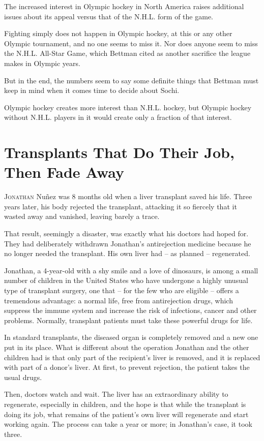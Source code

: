 ﻿\documentclass[12pt]{article}
\begin{document}
The increased interest in Olympic hockey in North America raises additional issues about its appeal
versus that of the N.H.L. form of the game.

Fighting simply does not happen in Olympic hockey, at this or any other Olympic tournament, and no
one seems to miss it. Nor does anyone seem to miss the N.H.L. All-Star Game, which Bettman cited as
another sacrifice the league makes in Olympic years.

But in the end, the numbers seem to say some definite things that Bettman must keep in mind when it
comes time to decide about Sochi.

Olympic hockey creates more interest than N.H.L. hockey, but Olympic hockey without N.H.L. players
in it would create only a fraction of that interest.

\section{Transplants That Do Their Job, Then Fade Away}

\lettrine{J}{onathan} Nu\~{n}ez was 8 months old when a liver transplant
saved his life. Three years later, his body rejected the transplant, attacking it so fiercely that
it wasted away and vanished, leaving barely a trace.

That result, seemingly a disaster, was exactly what his doctors had hoped for. They had deliberately
withdrawn Jonathan's antirejection medicine because he no longer needed the transplant. His own
liver had -- as planned -- regenerated.

Jonathan, a 4-year-old with a shy smile and a love of dinosaurs, is among a small number of children
in the United States who have undergone a highly unusual type of transplant surgery, one that -- for
the few who are eligible -- offers a tremendous advantage: a normal life, free from antirejection
drugs, which suppress the immune system and increase the risk of infections, cancer and other
problems. Normally, transplant patients must take these powerful drugs for life.

In standard transplants, the diseased organ is completely removed and a new one put in its place.
What is different about the operation Jonathan and the other children had is that only part of the
recipient's liver is removed, and it is replaced with part of a donor's liver. At first, to prevent
rejection, the patient takes the usual drugs.

Then, doctors watch and wait. The liver has an extraordinary ability to regenerate, especially in
children, and the hope is that while the transplant is doing its job, what remains of the patient's
own liver will regenerate and start working again. The process can take a year or more; in
Jonathan's case, it took three.
\end{document}

